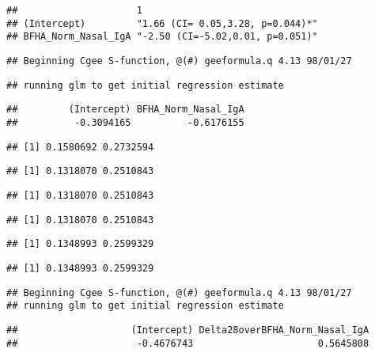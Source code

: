 \documentclass[
]{article}
\begin{document}
\begin{verbatim}
##                     1                               
## (Intercept)         "1.66 (CI= 0.05,3.28, p=0.044)*"
## BFHA_Norm_Nasal_IgA "-2.50 (CI=-5.02,0.01, p=0.051)"
\end{verbatim}

\begin{verbatim}
## Beginning Cgee S-function, @(#) geeformula.q 4.13 98/01/27
\end{verbatim}

\begin{verbatim}
## running glm to get initial regression estimate
\end{verbatim}

\begin{verbatim}
##         (Intercept) BFHA_Norm_Nasal_IgA 
##          -0.3094165          -0.6176155
\end{verbatim}

\begin{verbatim}
## [1] 0.1580692 0.2732594
\end{verbatim}

\begin{verbatim}
## [1] 0.1318070 0.2510843
\end{verbatim}

\begin{verbatim}
## [1] 0.1318070 0.2510843
\end{verbatim}

\begin{verbatim}
## [1] 0.1318070 0.2510843
\end{verbatim}

\begin{verbatim}
## [1] 0.1348993 0.2599329
\end{verbatim}

\begin{verbatim}
## [1] 0.1348993 0.2599329
\end{verbatim}

\begin{verbatim}
## Beginning Cgee S-function, @(#) geeformula.q 4.13 98/01/27
## running glm to get initial regression estimate
\end{verbatim}

\begin{verbatim}
##                    (Intercept) Delta28overBFHA_Norm_Nasal_IgA 
##                     -0.4676743                      0.5645808
\end{verbatim}
\end{document}
